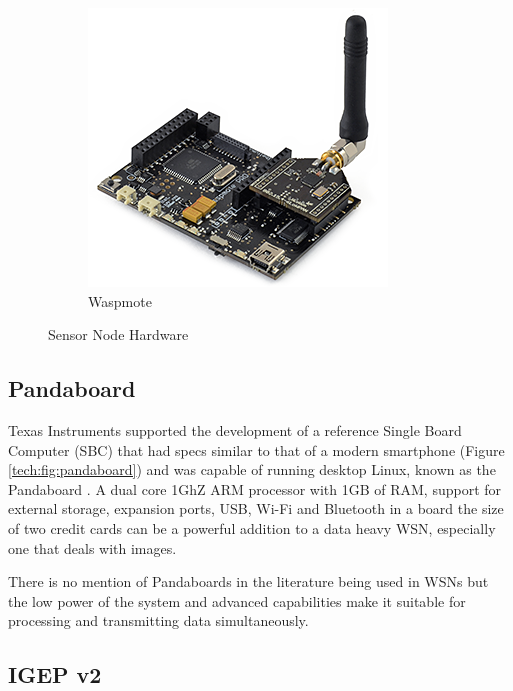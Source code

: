 \begin{figure}[ht!]
\begin{subfigure}{.5\textwidth}
		\includegraphics[width=\textwidth]{Chap3/figures/waspmote}
		\caption{Waspmote}
		\label{tech:fig:waspmote}
		\end{subfigure}
\caption{Sensor Node Hardware}
\label{tech:fig:nodes}
\end{figure}

\subsection{Pandaboard}

Texas Instruments supported the development of a reference Single Board Computer (SBC) that had specs similar to that of a modern smartphone (Figure \ref{tech:fig:pandaboard}) and was capable of running desktop Linux, known as the Pandaboard \cite{instruments2012pandaboard}. A dual core 1GhZ ARM processor with 1GB of RAM, support for external storage, expansion ports, USB, Wi-Fi and Bluetooth in a board the size of two credit cards can be a powerful addition to a data heavy WSN, especially one that deals with images.

There is no mention of Pandaboards in the literature being used in WSNs but the low power of the system and advanced capabilities make it suitable for processing and transmitting data simultaneously. 
	
\subsection{IGEP v2}

